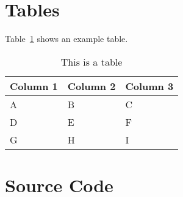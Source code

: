 
\section{Tables}

Table~\ref{tab:table-one} shows an example table.

\begin{table}[htbp]
    \centering
    \caption{This is a table}
    \label{tab:table-one}
    \begin{tabular}{lll}
        \addlinespace
        \toprule
        Column 1 & Column 2 & Column 3 \\
        \midrule
        A     & B     & C \\
        D     & E     & F \\
        G     & H     & I \\
        \bottomrule
    \end{tabular}
\end{table}

\section{Source Code}

